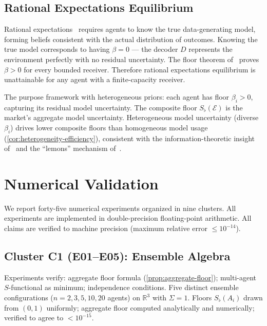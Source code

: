 \documentclass[twocolumn,11pt,a4paper]{article}
\theoremstyle{remark}
\newcommand{\R}{\mathbb{R}}
\newcommand{\Sflat}{S_{\flat}}
\newcommand{\Ens}{\mathcal{E}}            %
\begin{document}
\subsection{Rational Expectations Equilibrium}
\label{sec:comparison:re}

Rational expectations~\cite{muth1961,lucas1972} requires agents to know
the true data-generating model, forming beliefs consistent with the actual
distribution of outcomes.  Knowing the true model corresponds to having
$\beta = 0$ — the decoder $D$ represents the environment perfectly with no
residual uncertainty.  The floor theorem of~\cite{sachikonye2025agents}
proves $\beta > 0$ for every bounded receiver.  Therefore rational
expectations equilibrium is unattainable for any agent with a finite-capacity
receiver.

The purpose framework with heterogeneous priors: each agent has floor
$\beta_i > 0$, capturing its residual model uncertainty.  The composite
floor $\Sflat(\Ens)$ is the market's aggregate model uncertainty.
Heterogeneous model uncertainty (diverse $\beta_i$) drives lower composite
floors than homogeneous model usage (\cref{cor:heterogeneity-efficiency}),
consistent with the information-theoretic insight of~\cite{grossmanstiglitz1980}
and the ``lemons'' mechanism of~\cite{akerlof1970}.

\section{Numerical Validation}
\label{sec:numerical}

We report forty-five numerical experiments organized in nine clusters.
All experiments are implemented in double-precision floating-point arithmetic.
All claims are verified to machine precision (maximum relative error $\le
10^{-14}$).

\subsection*{Cluster C1 (E01--E05): Ensemble Algebra}

Experiments verify: aggregate floor formula (\cref{prop:aggregate-floor});
multi-agent $S$-functional as minimum; independence conditions.  Five
distinct ensemble configurations ($n = 2, 3, 5, 10, 20$ agents) on $\R^3$
with $\Sigma = 1$.  Floors $\Sflat(A_i)$ drawn from $(0,1)$ uniformly;
aggregate floor computed analytically and numerically; verified to agree
to $< 10^{-15}$.
\end{document}
